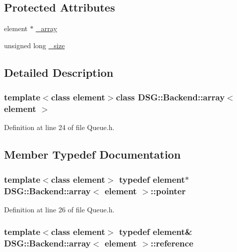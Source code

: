 \subsection*{Protected Attributes}
\begin{DoxyCompactItemize}
\item 
element $\ast$ \hyperlink{classDSG_1_1Backend_1_1array_a520f838f921d4f48852694e79da0564c}{\+\_\+array}
\item 
unsigned long \hyperlink{classDSG_1_1Backend_1_1array_a44349f32c09ebb31d5eadbe9a222cba2}{\+\_\+size}
\end{DoxyCompactItemize}


\subsection{Detailed Description}
\subsubsection*{template$<$class element$>$class D\+S\+G\+::\+Backend\+::array$<$ element $>$}



Definition at line 24 of file Queue.\+h.



\subsection{Member Typedef Documentation}
\hypertarget{classDSG_1_1Backend_1_1array_abfd0db2267892f4d2f397638faf85ca3}{
\subsubsection[{pointer}]{\setlength{\rightskip}{0pt plus 5cm}template$<$class element$>$ typedef element$\ast$ {\bf D\+S\+G\+::\+Backend\+::array}$<$ element $>$\+::{\bf pointer}}}\label{classDSG_1_1Backend_1_1array_abfd0db2267892f4d2f397638faf85ca3}


Definition at line 26 of file Queue.\+h.

\hypertarget{classDSG_1_1Backend_1_1array_a8af2a20d445daee75e9e6b122498e0a6}{
\subsubsection[{reference}]{\setlength{\rightskip}{0pt plus 5cm}template$<$class element$>$ typedef element\& {\bf D\+S\+G\+::\+Backend\+::array}$<$ element $>$\+::{\bf reference}}}\label{classDSG_1_1Backend_1_1array_a8af2a20d445daee75e9e6b122498e0a6}


